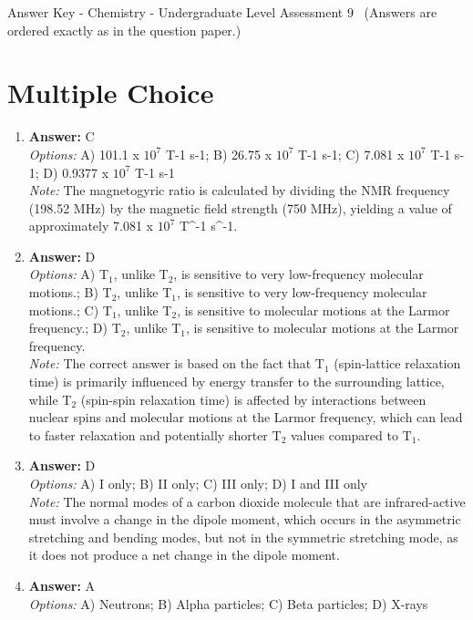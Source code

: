 \documentclass[12pt]{article}
\begin{document}
\begin{center}
Answer Key - Chemistry - Undergraduate Level Assessment 9 \
\small (Answers are ordered exactly as in the question paper.)
\end{center}

\section*{Multiple Choice}
\begin{enumerate}[label=\arabic*.]
\item \textbf{Answer:} C
\\ \textit{Options:} A) 101.1 x $10^7$ T-1 s-1; B) 26.75 x $10^7$ T-1 s-1; C) 7.081 x $10^7$ T-1 s-1; D) 0.9377 x $10^7$ T-1 s-1
\\ \textit{Note:} The magnetogyric ratio is calculated by dividing the NMR frequency (198.52 MHz) by the magnetic field strength (750 MHz), yielding a value of approximately 7.081 x $10^7$ T^-1 s^-1.
\item \textbf{Answer:} D
\\ \textit{Options:} A) T$_{1}$, unlike T$_{2}$, is sensitive to very low-frequency molecular motions.; B) T$_{2}$, unlike T$_{1}$, is sensitive to very low-frequency molecular motions.; C) T$_{1}$, unlike T$_{2}$, is sensitive to molecular motions at the Larmor frequency.; D) T$_{2}$, unlike T$_{1}$, is sensitive to molecular motions at the Larmor frequency.
\\ \textit{Note:} The correct answer is based on the fact that T$_{1}$ (spin-lattice relaxation time) is primarily influenced by energy transfer to the surrounding lattice, while T$_{2}$ (spin-spin relaxation time) is affected by interactions between nuclear spins and molecular motions at the Larmor frequency, which can lead to faster relaxation and potentially shorter T$_{2}$ values compared to T$_{1}$.
\item \textbf{Answer:} D
\\ \textit{Options:} A) I only; B) II only; C) III only; D) I and III only
\\ \textit{Note:} The normal modes of a carbon dioxide molecule that are infrared-active must involve a change in the dipole moment, which occurs in the asymmetric stretching and bending modes, but not in the symmetric stretching mode, as it does not produce a net change in the dipole moment.
\item \textbf{Answer:} A
\\ \textit{Options:} A) Neutrons; B) Alpha particles; C) Beta particles; D) X-rays

\end{enumerate}
\end{document}
